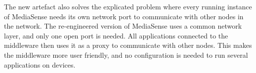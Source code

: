 The new artefact also solves the explicated problem where every running instance of MediaSense needs its own network port to communicate with other nodes in the network. The re-engineered version of MediaSense uses a common network layer, and only one open port is needed. All applications connected to the middleware then uses it as a proxy to communicate with other nodes. This makes the middleware more user friendly, and no configuration is needed to run several applications on devices. 
